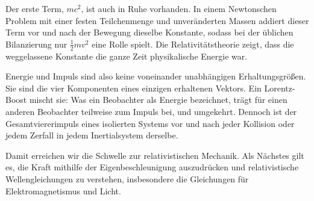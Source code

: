 Der erste Term, \(mc^2\), ist auch in Ruhe vorhanden. In einem Newtonschen Problem mit einer festen Teilchenmenge und unveränderten Massen addiert dieser Term vor und nach der Bewegung dieselbe Konstante, sodass bei der üblichen Bilanzierung nur \(\tfrac12mv^2\) eine Rolle spielt. Die Relativitätstheorie zeigt, dass die weggelassene Konstante die ganze Zeit physikalische Energie war.

Energie und Impuls sind also keine voneinander unabhängigen Erhaltungsgrößen. Sie sind die vier Komponenten eines einzigen erhaltenen Vektors. Ein Lorentz-Boost mischt sie: Was ein Beobachter als Energie bezeichnet, trägt für einen anderen Beobachter teilweise zum Impuls bei, und umgekehrt. Dennoch ist der Gesamtviererimpuls eines isolierten Systems vor und nach jeder Kollision oder jedem Zerfall in jedem Inertialsystem derselbe.

Damit erreichen wir die Schwelle zur relativistischen Mechanik. Als Nächstes gilt es, die Kraft mithilfe der Eigenbeschleunigung auszudrücken und relativistische Wellengleichungen zu verstehen, insbesondere die Gleichungen für Elektromagnetismus und Licht.